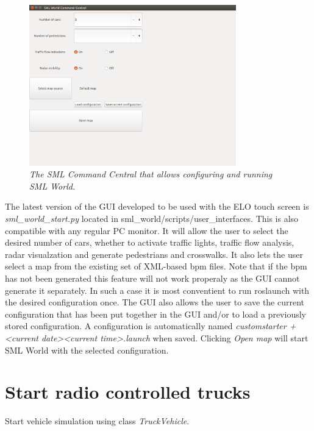 \documentclass[11pt,a4paper]{book}
\begin{document}
\begin{figure}[!ht]

  \centering
    \includegraphics[width=0.8\textwidth]{smlcommandcentral.png}
  \caption{\textit{The SML Command Central that allows configuring and running SML World.}}
\end{figure}

\noindent The latest version of the GUI developed to be used with the ELO touch screen is \textit{sml\_world\_start.py} located in sml\_world/scripts/user\_interfaces. This is also compatible with any regular PC monitor. It will allow the user to select the desired number of cars, whether to activate traffic lights, traffic flow analysis, radar visualzation and generate pedestrians and crosswalks. It also lets the user select a map from the existing set of XML-based bpm files. Note that if the bpm has not been generated this feature will not work properaly as the GUI cannot generate it separately. In such a case it is most conventient to run roslaunch with the desired configuration once. The GUI also allows the user to save the current configuration that has been put together in the GUI and/or to load a previously stored configuration. A configuration is automatically named \textit{customstarter + <current date><current time>.launch} when saved. Clicking \textit{Open map} will start SML World with the selected configuration. 


\section{Start radio controlled trucks}
Start vehicle simulation using class \textit{TruckVehicle}.
\end{document}

